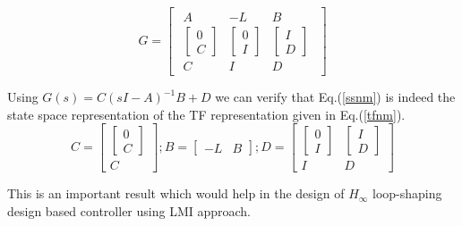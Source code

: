 \documentclass[a4paper,12pt]{article}
\begin{document}
	\begin{equation}
	G=\begin{bmatrix}
	\begin{array}{c|cc}
	A & -L & B\\ \hline
	\begin{bmatrix}
	0 \\ C
	\end{bmatrix}
	 & \begin{bmatrix}
	 0 \\I
	 \end{bmatrix}
	  & \begin{bmatrix}
	  I \\D
	  \end{bmatrix} \\
	  C & I & D
	\end{array}
	\end{bmatrix}
	\label{ssnm}
	\end{equation}
	
	Using $G(s)=C(sI-A)^{-1}B + D$ we can verify that Eq.(\ref{ssnm}) is indeed the state space representation of the TF representation given in Eq.(\ref{tfnm}).
	\[
	C= \begin{bmatrix}
	\begin{bmatrix}
	0 \\C
	\end{bmatrix} \\C
	\end{bmatrix}; 
	B=\begin{bmatrix}
	-L & B
	\end{bmatrix};
	D= \begin{bmatrix}
	\begin{bmatrix}
	0 \\I
	\end{bmatrix} & \begin{bmatrix}
	I \\ D
	\end{bmatrix} \\
	I & D
	\end{bmatrix}
	\]
	
This is an important result which would help in the design of $H_{\infty}$  loop-shaping design based controller using LMI approach. \\
\end{document}
